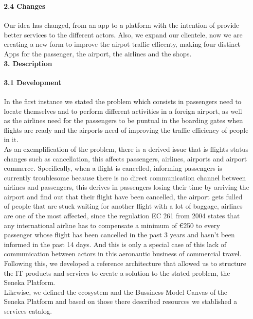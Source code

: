 \documentclass[]{article}
\begin{document}
\Large{\textbf{2.4 Changes}\\}\\
Our idea has changed, from an app to a platform with the intention of provide better services to the different actors. Also, we expand our clientele, now we are creating a new form to improve the airpot traffic efficenty, making four distinct Apps for the passenger, the airport, the airlines and the shops.\\
[0.7cm]

\Large{\textbf{3. Description}\\}\\

\Large{\textbf{3.1 Development}\\}\\

In the first instance we stated the problem which consists in passengers need to locate themselves and to perform different activities in a foreign airport, as well as the airlines need for the passengers to be puntual in the boarding gates when flights are ready and the airports need of improving the traffic efficiency of people in it.\\

As an exemplification of the problem, there is a derived issue that is flights status changes such as cancellation, this affects passengers, airlines, airports and airport commerce. Specifically, when a flight is cancelled, informing passengers is currently troublesome because there is no direct communication channel between airlines and passengers, this derives in passengers losing their time by arriving the airport and find out that their flight have been cancelled, the airport gets fulled of people that are stuck waiting for another flight with a lot of baggage, airlines are one of the most affected, since the regulation EC 261 from 2004 states that any international airline has to compensate a minimum of €250 to every passenger whose flight has been cancelled in the past 3 years and hasn't been informed in the past 14 days. And this is only a special case of this lack of communication between actors in this aeronautic business of commercial travel.\\

Following this, we developed a reference architecture that allowed us to structure the IT products and services to create a solution to the stated problem, the Seneka Platform.\\
Likewise, we defined the ecosystem and the Bussiness Model Canvas of the Seneka Platform and based on those there described resources we  stablished a services catalog.\\
\end{document}
